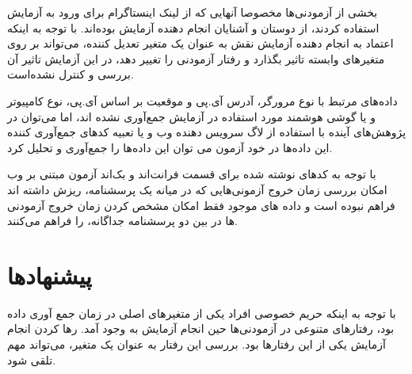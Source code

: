 بخشی از آزمودنی‌ها مخصوصا آنهایی که از لینک اینستاگرام برای ورود به آزمایش استفاده
کردند، از دوستان و آشنایان انجام دهنده آزمایش بوده‌اند. با توجه به اینکه اعتماد به انجام دهنده آزمایش نقش
به عنوان یک متغیر تعدیل کننده، می‌تواند بر روی متغیر‌های وابسته تاثیر بگذارد و رفتار آزمودنی را تغییر دهد،
در این آزمایش تاثیر آن بررسی و کنترل نشده‌است.

داده‌های مرتبط با نوع مرورگر، آدرس آی.پی و موقعیت بر اساس آی.پی، نوع کامپیوتر و یا گوشی هوشمند مورد استفاده
در آزمایش جمع‌آوری نشده اند، اما می‌توان در پژوهش‌های آینده با استفاده از لاگ سرویس دهنده وب و یا تعبیه کدهای جمع‌آوری کننده این داده‌ها
در خود آزمون می توان این داده‌ها را جمع‌آوری و تحلیل کرد.

با توجه به کدهای نوشته شده برای قسمت فرانت‌اند و بک‌اند آزمون مبتنی بر وب امکان بررسی زمان خروج آزمونی‌هایی که در میانه یک پرسشنامه،
ریزش داشته اند فراهم نبوده است و داده های موجود فقط امکان مشخص کردن زمان خروج آزمودنی ها در بین دو پرسشنامه جداگانه، را فراهم  می‌کنند.


\section{پیشنهادها}
با  توجه به اینکه  حریم خصوصی افراد یکی از متغیر‌های اصلی در زمان جمع آوری
داده بود، رفتار‌های متنوعی در آزمودنی‌ها حین انجام آزمایش به وجود
آمد. رها کردن انجام آزمایش یکی از این رفتار‌ها
بود. بررسی این رفتار به عنوان یک متغیر، می‌تواند مهم تلقی شود.
